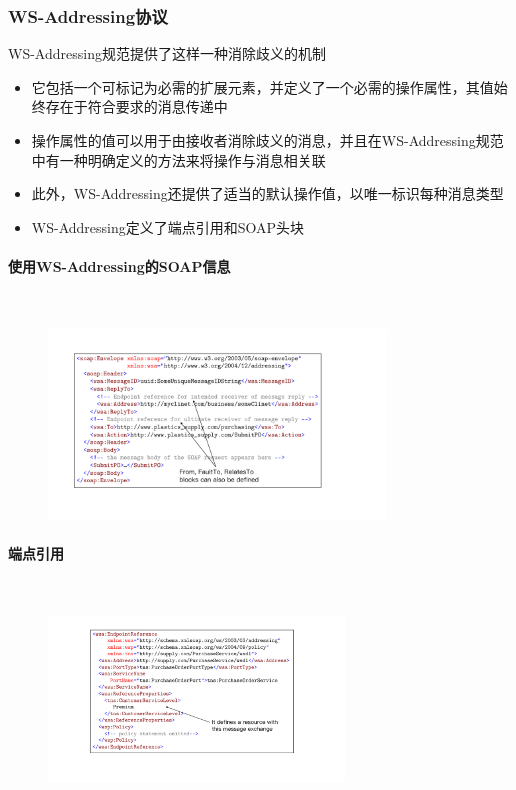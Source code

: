 \subsubsection{WS-Addressing协议}
WS-Addressing规范提供了这样一种消除歧义的机制
\begin{itemize}
    \item 它包括一个可标记为必需的扩展元素，并定义了一个必需的操作属性，其值始终存在于符合要求的消息传递中
    \item 操作属性的值可以用于由接收者消除歧义的消息，并且在WS-Addressing规范中有一种明确定义的方法来将操作与消息相关联
    \item 此外，WS-Addressing还提供了适当的默认操作值，以唯一标识每种消息类型
    \item WS-Addressing定义了端点引用和SOAP头块
\end{itemize}

\paragraph*{使用WS-Addressing的SOAP信息}~{} \par
\begin{figure}[H]
    \vspace{-0.5em}
	\centering
	\includegraphics[width=0.8\textwidth]{images/使用WS-Addressing的SOAP信息.pdf}
    \vspace{-1em}
\end{figure}

\paragraph*{端点引用}~{} \par
\begin{figure}[H]
    \vspace{-0.5em}
	\centering
	\includegraphics[width=0.7\textwidth]{images/端点引用.pdf}
    \vspace{-1em}
\end{figure}

